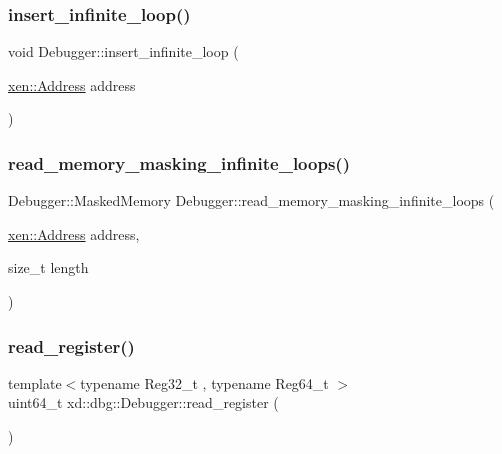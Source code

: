 \subsubsection{\texorpdfstring{insert\+\_\+infinite\+\_\+loop()}{insert\_infinite\_loop()}}
{\footnotesize\ttfamily void Debugger\+::insert\+\_\+infinite\+\_\+loop (\begin{DoxyParamCaption}\item[{\mbox{\hyperlink{namespacexd_1_1xen_a94a8d6c9448e8330c771c100dba152c3}{xen\+::\+Address}}}]{address }\end{DoxyParamCaption})}

\mbox{\label{classxd_1_1dbg_1_1_debugger_ab721cea744f771218aac15ee84361fe0}} 
\subsubsection{\texorpdfstring{read\+\_\+memory\+\_\+masking\+\_\+infinite\+\_\+loops()}{read\_memory\_masking\_infinite\_loops()}}
{\footnotesize\ttfamily Debugger\+::\+Masked\+Memory Debugger\+::read\+\_\+memory\+\_\+masking\+\_\+infinite\+\_\+loops (\begin{DoxyParamCaption}\item[{\mbox{\hyperlink{namespacexd_1_1xen_a94a8d6c9448e8330c771c100dba152c3}{xen\+::\+Address}}}]{address,  }\item[{size\+\_\+t}]{length }\end{DoxyParamCaption})}

\mbox{\label{classxd_1_1dbg_1_1_debugger_ad2bfc260b023b17e4da5ca8019319b7b}} 
\subsubsection{\texorpdfstring{read\+\_\+register()}{read\_register()}}
{\footnotesize\ttfamily template$<$typename Reg32\+\_\+t , typename Reg64\+\_\+t $>$ \\
uint64\+\_\+t xd\+::dbg\+::\+Debugger\+::read\+\_\+register (\begin{DoxyParamCaption}{ }\end{DoxyParamCaption})\hspace{0.3cm}{\ttfamily [inline]}}

